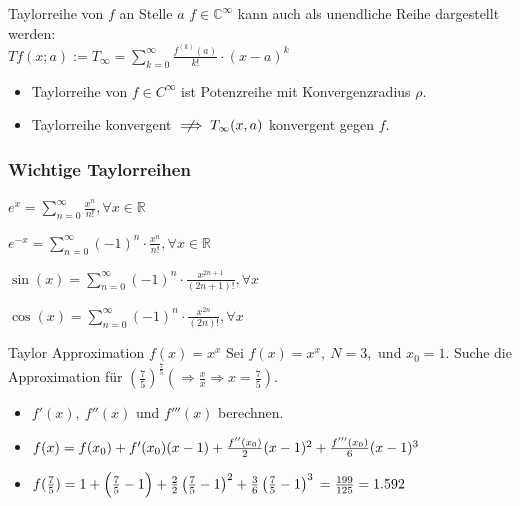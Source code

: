 \documentclass[a4paper]{article}
\newcommand\notimplies{\centernot\implies}
\begin{document}
\begin{mainbox}{Taylorreihe von $f$ an Stelle $a$}
  $f \in \mathbb{C}^{\infty}$ kann auch als unendliche Reihe dargestellt werden: \\
  $Tf(x;a) := T_\infty = \sum_{k=0}^{\infty} \frac{f^{(k)}(a)}{k!} \cdot (x-a)^k$
\end{mainbox}
\begin{itemize}[leftmargin=4.5mm, topsep=1pt, parsep=1pt]
  \item Taylorreihe von $f \in C^\infty$ ist Potenzreihe mit Konvergenzradius $\rho$. 
  \item Taylorreihe konvergent $\notimplies T_\infty(x, a)$ konvergent gegen $f$.
\end{itemize}

\subsubsection*{Wichtige Taylorreihen }
 \begin{inparaitem}
      \item $e^x = \sum_{n=0}^{\infty}\frac{x^n}{n!}, \forall x \in \mathbb{R}$
      \quad
      \item $e^{-x} = \sum_{n=0}^{\infty} (-1)^n \cdot \frac{x^n}{n!}, \forall x \in \mathbb{R}$
      \\
      \item $\sin(x) = \sum_{n=0}^{\infty} (-1)^n \cdot \frac{x^{2n+1}}{(2n+1)!}, \forall x$ \\
      \item $\cos(x) = \sum_{n=0}^{\infty}(-1)^n \cdot \frac{x^{2n}}{(2n)!}, \forall x$
  \end{inparaitem}

\begin{bspbox}{Taylor Approximation $f(x) = x^x$}
  Sei $f(x) = x^x, \ N = 3,$ und $x_0 = 1$. Suche die Approximation für $\left(\frac{7}{5}\right)^{\frac{7}{5}} (\Rightarrow \frac{x}{x} \Longrightarrow x = \frac{7}{5})$.
  \begin{itemize}[leftmargin=3.5mm, topsep=1pt, parsep=1pt]
    \item[1.] $f'(x), \ f''(x)$ und $f'''(x)$ berechnen.
    \item[2.] $f(x) = f(x_0) + f'(x_0)(x-1) + \frac{f''(x_0)}{2}(x-1)^2 \\ + \frac{f'''(x_0)}{6}(x-1)^3$
    \item[3.] $f(\frac{7}{5}) = 1 + \Big(\frac{7}{5}-1\Big) + \frac{2}{2}\left(\frac{7}{5}-1\right)^2 + \frac{3}{6}\left(\frac{7}{5}-1\right)^3 \\ = \frac{199}{125} = 1.592$
  \end{itemize}
\end{bspbox}
\end{document}
